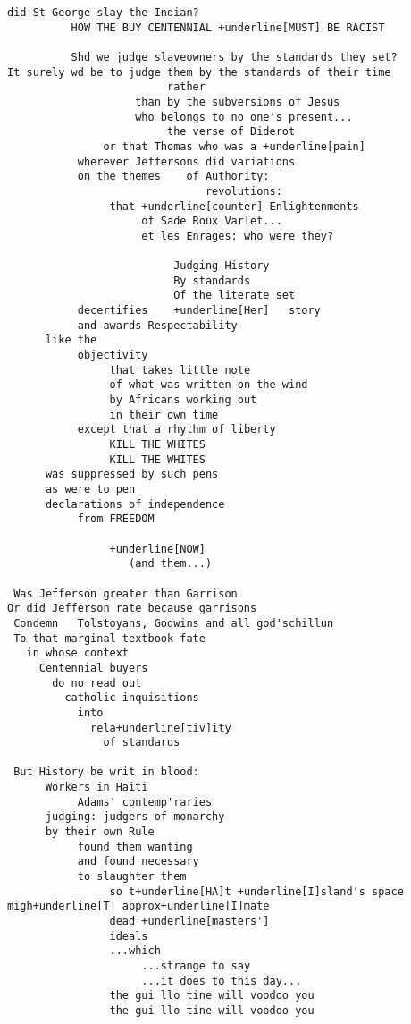 \documentclass[12pt, onecolumn, letterpaper, oneside]{book}
\begin{document}
\begin{Verbatim}[commandchars=+\[\]]
                    did St George slay the Indian?
          HOW THE BUY CENTENNIAL +underline[MUST] BE RACIST
          
          Shd we judge slaveowners by the standards they set?
It surely wd be to judge them by the standards of their time
                         rather
                    than by the subversions of Jesus
                    who belongs to no one's present...
                         the verse of Diderot
               or that Thomas who was a +underline[pain]
           wherever Jeffersons did variations
           on the themes    of Authority:
                               revolutions:
                that +underline[counter] Enlightenments
                     of Sade Roux Varlet...
                     et les Enrages: who were they?
                     
                          Judging History
                          By standards
                          Of the literate set
           decertifies    +underline[Her]   story
           and awards Respectability
      like the
           objectivity
                that takes little note
                of what was written on the wind
                by Africans working out
                in their own time
           except that a rhythm of liberty
                KILL THE WHITES
                KILL THE WHITES
      was suppressed by such pens
      as were to pen
      declarations of independence
           from FREEDOM
           
                +underline[NOW]
                   (and them...)
                   
 Was Jefferson greater than Garrison
Or did Jefferson rate because garrisons
 Condemn   Tolstoyans, Godwins and all god'schillun
 To that marginal textbook fate
   in whose context
     Centennial buyers
       do no read out
         catholic inquisitions
           into
             rela+underline[tiv]ity
               of standards
 
 But History be writ in blood:
      Workers in Haiti
           Adams' contemp'raries
      judging: judgers of monarchy
      by their own Rule
           found them wanting
           and found necessary
           to slaughter them
                so t+underline[HA]t +underline[I]sland's space migh+underline[T] approx+underline[I]mate
                dead +underline[masters']
                ideals
                ...which
                     ...strange to say
                     ...it does to this day...
                the gui llo tine will voodoo you
                the gui llo tine will voodoo you
                

\end{Verbatim}
\end{document}
